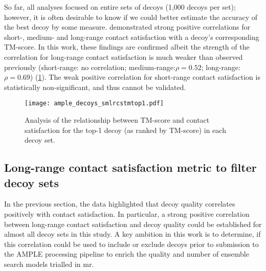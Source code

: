 So far, all analyses focused on entire sets of decoys (1,000 decoys per set); however, it is often desirable to know if we could better estimate the accuracy of the best decoy by some measure. \textcite{Kosciolek2014-bt} demonstrated strong positive correlations for short-, medium- and long-range contact satisfaction with a decoy's corresponding TM-score. In this work, these findings are confirmed albeit the strength of the correlation for long-range contact satisfaction is much weaker than observed previously (short-range: no correlation; medium-range:$\rho=0.52$; long-range:$\rho=0.69$) (\cref{fig:ample_decoys_smlrcstmtop1}). The weak positive correlation for short-range contact satisfaction is statistically non-significant, and thus cannot be validated. 

\begin{figure}[H]
	\centering
        \texttt{[image: ample\_decoys\_smlrcstmtop1.pdf]}
        \caption[Top-1 decoy TM-score and contact satisfaction analysis]{Analysis of the relationship between TM-score and contact satisfaction for the top-1 decoy (as ranked by TM-score) in each decoy set.}
	\label{fig:ample_decoys_smlrcstmtop1}
\end{figure}





\subsection{Long-range contact satisfaction metric to filter decoy sets}
In the previous section, the data highlighted that decoy quality correlates positively with contact satisfaction. In particular, a strong positive correlation between long-range contact satisfaction and decoy quality could be established for almost all decoy sets in this study. A key ambition in this work is to determine, if this correlation could be used to include or exclude decoys prior to submission to the AMPLE processing pipeline to enrich the quality and number of ensemble search models trialled in \gls{mr}. 

